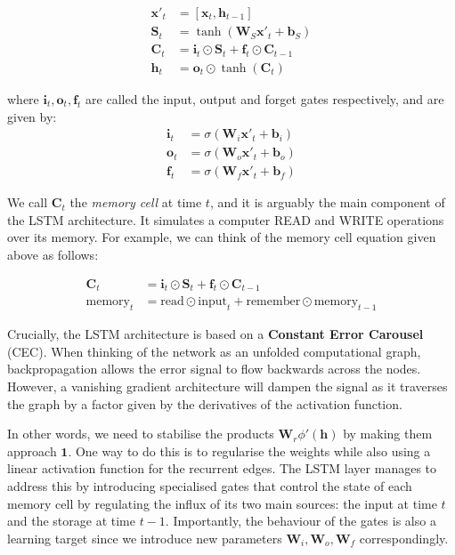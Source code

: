 \documentclass[pdftex,12pt,a4paper]{article}
\theoremstyle{definition}
\theoremstyle{remark}
\newcommand*{\V}[1]{\mathbf{#1}}%
\begin{document}
\begin{align*}
    \V{x}'_t &= [ \V{x}_t, \V{h}_{t-1} ]\\
    \V{S}_t &= \tanh(\V{W}_S\V{x}'_t + \V{b}_S)\\
    \V{C}_t &= \V{i}_t\odot\V{S}_t + \V{f}_t\odot\V{C}_{t-1}\\
    \V{h}_t &= \V{o}_t \odot \tanh(\V{C}_t)
\end{align*}
\par where $\V{i}_t, \V{o}_t, \V{f}_t$ are called the input, output and forget gates respectively, and are given by:
\begin{align*}
    \V{i}_t &= \sigma(\V{W}_i\V{x}'_t + \V{b}_i)\\
    \V{o}_t &= \sigma(\V{W}_o\V{x}'_t + \V{b}_o)\\
    \V{f}_t &= \sigma(\V{W}_f\V{x}'_t + \V{b}_f)
\end{align*}

\par We call $\V{C}_t$ the \textit{memory cell} at time $t$, and it is arguably the main component of the LSTM architecture. It simulates a computer READ and WRITE operations over its memory. For example, we can think of the memory cell equation given above as follows:

\begin{align*}
    \V{C}_t &= \V{i}_t\odot\V{S}_t + \V{f}_t\odot\V{C}_{t-1}\\
    \text{memory}_t &= \text{read}\odot\text{input}_t + \text{remember}\odot\text{memory}_{t-1}
\end{align*}

\par Crucially, the LSTM architecture is based on a \textbf{Constant Error Carousel} (CEC). When thinking of the network as an unfolded computational graph, backpropagation allows the error signal to flow backwards across the nodes. However, a vanishing gradient architecture will dampen the signal as it traverses the graph by a factor given by the derivatives of the activation function. 

\par In other words, we need to stabilise the products $\V{W}_r\phi'{(\V{h})}$ by making them approach $\V{1}$. One way to do this is to regularise the weights while also using a linear activation function for the recurrent edges.  The LSTM layer manages to address this by introducing specialised gates that control the state of each memory cell by regulating the influx of its two main sources: the input at time $t$ and the storage at time $t-1$. Importantly, the behaviour of the gates is also a learning target since we introduce new parameters $\V{W}_i, \V{W}_o, \V{W}_f$ correspondingly.  
\end{document}
